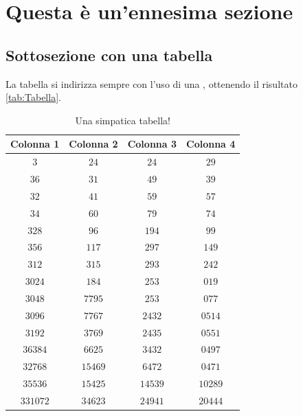  

\section{Questa è un'ennesima sezione}

\lipsum[4]

\subsection{Sottosezione con una tabella}

La tabella si indirizza sempre con l'uso di una , ottenendo il risultato \autoref{tab:Tabella}.

\begin{table}
    \caption{Una simpatica tabella!}
    \begin{center}
    \begin{tabular}{c|c|c|c}
        \textbf{Colonna 1} & \textbf{Colonna 2} & \textbf{Colonna 3} & \textbf{Colonna 4} \\
        \hline
            $3$      & $24$     & $24$    & $29$ \\ 
            $36$     & $31$     & $49$    & $39$ \\ 
            $32$     & $41$     & $59$    & $57$ \\ 
            $34$     & $60$     & $79$    & $74$ \\ 
            $328$    & $96$     & $194$   & $99$ \\ 
            $356$    & $117$    & $297$   & $149$ \\ 
            $312$    & $315$    & $293$   & $242$ \\ 
            $3024$   & $184$    & $253$   & $019$ \\ 
            $3048$   & $7795$   & $253$   & $077$ \\ 
            $3096$   & $7767$   & $2432$  & $0514$ \\ 
            $3192$   & $3769$   & $2435$  & $0551$ \\ 
            $36384$  & $6625$   & $3432$  & $0497$ \\ 
            $32768$  & $15469$  & $6472$  & $0471$ \\ 
            $35536$  & $15425$  & $14539$ & $10289$ \\ 
            $331072$ & $34623$  & $24941$ & $20444$ \\  
        \end{tabular}
    \end{center}
    \label{tab:Tabella}
\end{table}